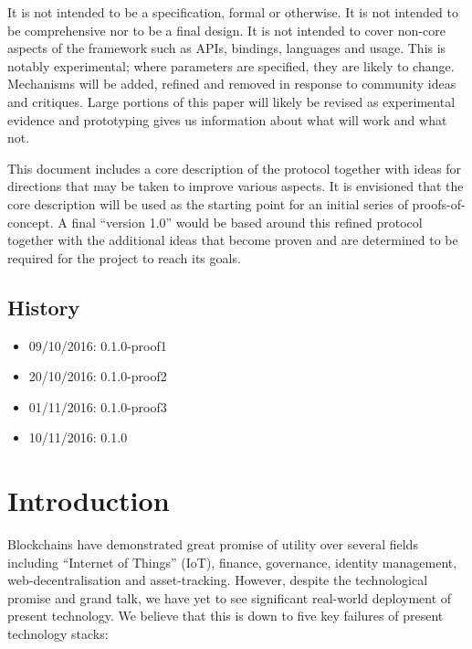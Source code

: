 \documentclass[usepdftitle=false]{beamer}
\begin{document}
\begin{frame}
 It is not intended to be a specification, formal or otherwise. It is not intended to be comprehensive nor to be a final design. It is not intended to cover non-core aspects of the framework such as APIs, bindings, languages and usage. This is notably experimental; where parameters are specified, they are likely to change. Mechanisms will be added, refined and removed in response to community ideas and critiques. Large portions of this paper will likely be revised as experimental evidence and prototyping gives us information about what will work and what not.

 This document includes a core description of the protocol together with ideas for directions that may be taken to improve various aspects. It is envisioned that the core description will be used as the starting point for an initial series of proofs-of-concept. A final ``version 1.0'' would be based around this refined protocol together with the additional ideas that become proven and are determined to be required for the project to reach its goals.

\subsection{History}\label{history}

\begin{itemize}
\item 09/10/2016: 0.1.0-proof1
\item 20/10/2016: 0.1.0-proof2
\item 01/11/2016: 0.1.0-proof3
\item 10/11/2016: 0.1.0
\end{itemize}

\section{Introduction}\label{introduction}

 Blockchains have demonstrated great promise of utility over several fields including ``Internet of Things'' (IoT), finance, governance, identity management, web-decentralisation and asset-tracking. However, despite the technological promise and grand talk, we have yet to see significant real-world deployment of present technology. We believe that this is down to five key failures of present technology stacks:


\end{frame}
\end{document}
